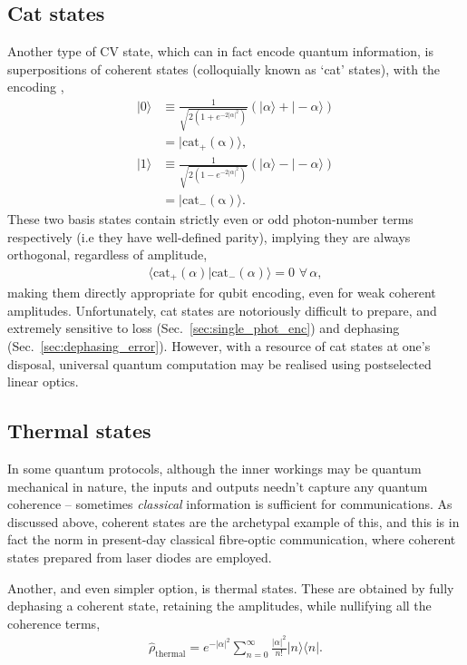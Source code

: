 \documentclass[aps,rmp,twocolumn,amsmath,amssymb,nofootinbib,superscriptaddress,longbibliography,floatfix]{revtex4-1}
\newcommand{\bra}[1]{\langle#1|}
\newcommand{\ket}[1]{|#1\rangle}
\begin{document}
%
%

\subsection{Cat states} \label{sec:cat_enc}

Another type of CV state, which can in fact encode quantum information, is superpositions of coherent states (colloquially known as `cat' states), with the encoding \cite{???},
\begin{align}
\ket{0} &\equiv \frac{1}{\sqrt{2(1+e^{-2|\alpha|^2})}} (\ket{\alpha}+\ket{-\alpha}) \nonumber \\
&= \ket{\mathrm{cat_+(\alpha)}},\nonumber \\
\ket{1} &\equiv \frac{1}{\sqrt{2(1-e^{-2|\alpha|^2})}}(\ket{\alpha}-\ket{-\alpha}) \nonumber \\
&= \ket{\mathrm{cat_-(\alpha)}}.
\end{align}
These two basis states contain strictly even or odd photon-number terms respectively (i.e they have well-defined parity), implying they are always orthogonal, regardless of amplitude,
\begin{align}
\langle\mathrm{cat}_+(\alpha)|\mathrm{cat}_-(\alpha)\rangle = 0 \,\,\forall\,\alpha,
\end{align}
making them directly appropriate for qubit encoding, even for weak coherent amplitudes. Unfortunately, cat states are notoriously difficult to prepare, and extremely sensitive to loss (Sec.~\ref{sec:single_phot_enc}) and dephasing (Sec.~\ref{sec:dephasing_error}). However, with a resource of cat states at one's disposal, universal quantum computation may be realised using postselected linear optics.

%
%

\subsection{Thermal states}

In some quantum protocols, although the inner workings may be quantum mechanical in nature, the inputs and outputs needn't capture any quantum coherence -- sometimes \emph{classical} information is sufficient for communications. As discussed above, coherent states are the archetypal example of this, and this is in fact the norm in present-day classical fibre-optic communication, where coherent states prepared from laser diodes are employed.

Another, and even simpler option, is thermal states. These are obtained by fully dephasing a coherent state, retaining the amplitudes, while nullifying all the coherence terms,
\begin{align}
\hat\rho_\mathrm{thermal} = e^{-|\alpha|^2} \sum_{n=0}^\infty \frac{|\alpha|^2}{n!}\ket{n}\bra{n}.
\end{align}
\end{document}
